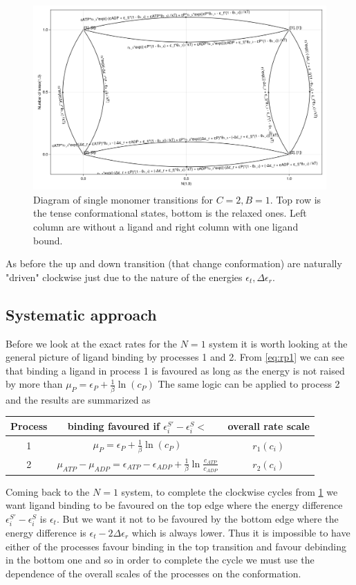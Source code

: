 \documentclass[11pt]{article}
\begin{document}
\begin{figure}[H]
    \includegraphics[width=\textwidth]{../../plots/symgraph_B=1_C=2_N=1_version=2.5.png}
    \caption{
        Diagram of single monomer transitions for $C=2,B=1$.
        Top row is the tense conformational states, bottom is the relaxed ones.
        Left column are without a ligand and right column with one ligand bound.
    }\label{fig:4sTs}
\end{figure}

As before the up and down transition (that change conformation) are naturally "driven" clockwise just due to the nature of the energies $\epsilon_t,\Delta\epsilon_r$.
\subsection{Systematic approach}\label{sec:fcsys}
Before we look at the exact rates for the $N=1$ system it is worth looking at the general picture of ligand binding by processes 1 and 2.
From \cref{eq:rp1} we can see that binding a ligand in process 1 is favoured as long as the energy is not raised by more than $\mu_P = \epsilon_P+\frac{1}{\beta}\ln(c_P)$
The same logic can be applied to process 2 and the results are summarized as
\begin{table}[H]
    \centering
    \begin{tabular}{c|c|c}
        Process & binding favoured if $\epsilon^{S'}_i-\epsilon^S_i<$ & overall rate scale \\
        \hline
        1 & $\mu_P = \epsilon_P+\frac{1}{\beta}\ln(c_P)$ & $r_1(c_i)$ \\
        \hline
        2 & $\mu_{ATP}-\mu_{ADP} = \epsilon_{ATP}-\epsilon_{ADP}+\frac{1}{\beta}\ln{\frac{c_{ATP}}{c_{ADP}}}$ & $r_2(c_i)$
    \end{tabular}
\end{table}
Coming back to the $N=1$ system, to complete the clockwise cycles from \cref{fig:4sTs} we want ligand binding to be favoured on the top edge where the energy difference $\epsilon^{S'}_i-\epsilon^S_i$ is $\epsilon_t$.
But we want it not to be favoured by the bottom edge where the energy difference is $\epsilon_t-2\Delta\epsilon_r$ which is always lower.
Thus it is impossible to have either of the processes favour binding in the top transition and favour debinding in the bottom one and so in order to complete the cycle we must use the dependence of the overall scales of the processes on the conformation.
\end{document}
